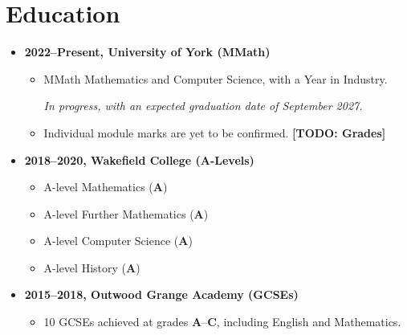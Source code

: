 \documentclass{article}
\newcommand{\todomark}[1]{{\color{red}\textbf{[TODO: #1]}}}
\begin{document}
\section{Education}
\begin{itemize}
        \item \textbf{2022--Present, University of York (MMath)}
        \begin{itemize}
                \item MMath Mathematics and Computer Science, with a Year in
                Industry.

                \textit{In progress, with an expected graduation date of
                September 2027.}

                \item Individual module marks are yet to be confirmed.
                \todomark{Grades}%
        \end{itemize}
        \item \textbf{2018--2020, Wakefield College (A-Levels)}
        \begin{itemize}
                \item A-level Mathematics (\textbf{A})
                \item A-level Further Mathematics (\textbf{A})
                \item A-level Computer Science (\textbf{A})
                \item A-level History (\textbf{A})
        \end{itemize}
        \item \textbf{2015--2018, Outwood Grange Academy (GCSEs)}
        \begin{itemize}
                \item 10 GCSEs achieved at grades \textbf{A}--\textbf{C},
                including English and Mathematics.
        \end{itemize}
\end{itemize}

%
%
\end{document}
